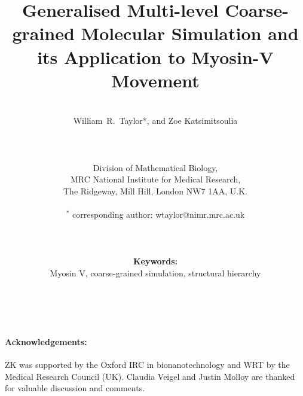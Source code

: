 \documentclass[12pt]{article}
\begin{document}
\title{\bf Generalised Multi-level Coarse-grained Molecular Simulation
and its Application to Myosin-V Movement
}

\author{\\
William~R.~Taylor*,
and
Zoe Katsimitsoulia
\\ \\ \\ \\
Division of Mathematical Biology,\\
MRC National Institute for Medical Research,\\
The Ridgeway, Mill Hill, London NW7 1AA, U.K.\\ \\ 
$^*$ corresponding author: wtaylor@nimr.mrc.ac.uk\\ \\ \\ \\
{\bf Keywords:}\\ Myosin V, coarse-grained simulation, structural hierarchy\\ \\ \\
}
\begin{singlespace}
\maketitle
\end{singlespace}
\clearpage

\clearpage

\clearpage

\clearpage

\clearpage

\clearpage
\begin{singlespace}


\paragraph{Acknowledgements:}
ZK was supported by the Oxford IRC in bionanotechnology and WRT by the Medical Research Council (UK).
Claudia Veigel and Justin Molloy are thanked for valuable discussion and comments.
\end{singlespace}
\end{document}
